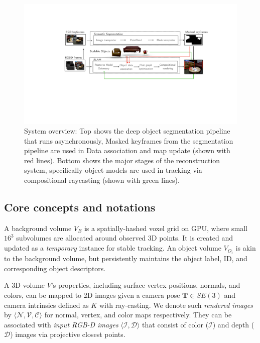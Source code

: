  \begin{figure}[ht!]
 	\centering
    \includegraphics[width=\linewidth]{figs/icra2021-compressed.pdf}
    \caption{\label{fig:overview} System overview: Top shows the deep object segmentation pipeline that runs asynchronously, Masked keyframes from the segmentation pipeline are used in Data association and map update (shown with red lines). Bottom shows the major stages of the reconstruction system, specifically object models are used in tracking via compositional raycasting (shown with green lines).}
 \end{figure}

\subsection{Core concepts and notations} \label{subsec: notation}
A background volume $V_B$ is a spatially-hashed voxel grid on GPU, where small $16^3$ subvolumes are allocated around observed 3D points. It is created and updated as a \textit{temporary} instance for stable tracking. An object volume $V_{O_i}$ is akin to the background volume, but persistently maintains the object label, ID, and corresponding object descriptors.

A 3D volume $V$'s properties, including surface vertex positions, normals, and colors, can be mapped to 2D images given a camera pose $\mathbf{T} \in SE(3)$ and camera intrinsics defined as $K$ with ray-casting. We denote such \textit{rendered images} by \( \langle \mathcal{N}, \mathcal{V}, \mathcal{C} \rangle \)  for normal, vertex, and color maps respectively. They can be associated with \textit{input RGB-D images} $\langle \mathcal{I}, \mathcal{D}\rangle $ that consist of color ($\mathcal{I}$) and depth ($\mathcal{D}$) images via projective closest points.

